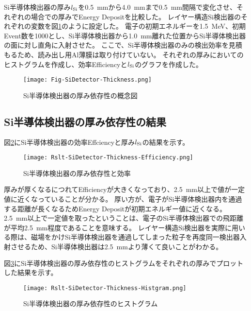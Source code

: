 \documentclass[a4paper,10pt]{jreport}
\begin{document}
Si半導体検出器の厚み$l_{\rm{Si}}$を\SI{0.5}{mm}から\SI{4.0}{mm}まで\SI{0.5}{mm}間隔で変化させ、それぞれの場合での厚みでEnergy Depositを比較した。
レイヤー構造Si検出器のそれぞれの変数を図\ref{Fig-SiDetector-Thickness}のように設定した。
電子の初期エネルギーを\SI{1.5}{MeV}、初期Event数を1000とし、Si半導体検出器から\SI{1.0}{mm}離れた位置からSi半導体検出器の面に対し直角に入射させた。
ここで、Si半導体検出器のみの検出効率を見積もるため、読み出し用Al薄膜は取り付けていない。
それぞれの厚みにおいてのヒストグラムを作成し、効率Efficiencyと$l_{\rm{Si}}$のグラフを作成した。

\begin{figure}[H]
	\center
	\texttt{[image: Fig-SiDetector-Thickness.png]}
	\caption{Si半導体検出器の厚み依存性の概念図} \label{Fig-SiDetector-Thickness}
\end{figure}




\subsection{Si半導体検出器の厚み依存性の結果}

図\ref{Rslt-SiDetector-Thickness-Efficiency}にSi半導体検出器の効率Effciencyと厚み$l_{\rm{Si}}$の結果を示す。

\begin{figure}[H]
	\center
	\texttt{[image: Rslt-SiDetector-Thickness-Efficiency.png]}
	\caption{Si半導体検出器の厚み依存性と効率} \label{Rslt-SiDetector-Thickness-Efficiency}
\end{figure}

厚みが厚くなるにつれてEfficiencyが大きくなっており、\SI{2.5}{mm}以上で値が一定値に近くなっていることが分かる。
厚い方が、電子がSi半導体検出器内を通過する距離が長くなるためEnergy Depositが初期エネルギー値に近くなる。
\SI{2.5}{mm}以上で一定値を取ったということは、電子のSi半導体検出器での飛距離が平均\SI{2.5}{mm}程度であることを意味する。
レイヤー構造Si検出器を実際に用いる際は、磁場をかけSi半導体検出器を通過してしまった粒子を再度同一検出器入射させるため、Si半導体検出器は\SI{2.5}{mm}より薄くて良いことがわかる。

図\ref{Rslt-SiDetector-Thickness-Histgram}にSi半導体検出器の厚み依存性のヒストグラムをそれぞれの厚みでプロットした結果を示す。

\begin{figure}[H]
	\center
	\texttt{[image: Rslt-SiDetector-Thickness-Histgram.png]}
	\caption{Si半導体検出器の厚み依存性のヒストグラム} \label{Rslt-SiDetector-Thickness-Histgram}
\end{figure}
\end{document}
